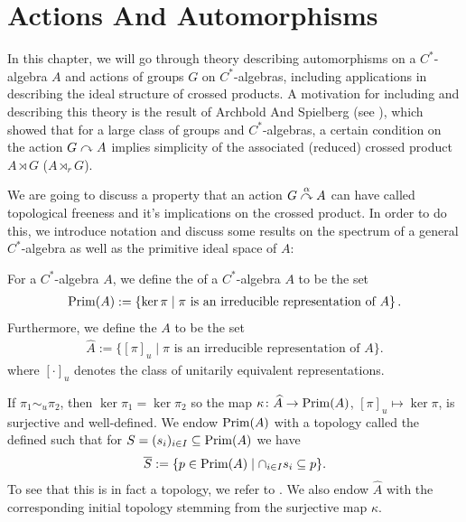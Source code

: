 \chapter{Actions And Automorphisms}
In this chapter, we will go through theory describing automorphisms on a $C^*$-algebra $A$ and actions of groups $G$ on $C^*$-algebras, including applications in describing the ideal structure of crossed products. A motivation for including and describing this theory is the result of Archbold And Spielberg (see \cite{archbold1994topologically}), which showed that for a large class of groups and $C^*$-algebras, a certain condition on the action $G \stackrel{}{\curvearrowright} A$ implies simplicity of the associated (reduced) crossed product $A \rtimes G$ ($A \rtimes_{r} G$).

We are going to discuss a property that an action $G \stackrel{\alpha}{\curvearrowright} A$ can have called topological freeness and it's implications on the crossed product. In order to do this, we introduce notation and discuss some results on the spectrum of a general $C^*$-algebra as well as the primitive ideal space of $A$:
\begin{definition}
	For a $C^*$-algebra $A$, we define the  of a $C^*$-algebra $A$ to be the set
	\begin{align*}
		\mathrm{Prim}(A) := \left\{ \ker \pi \mid \pi \text{ is an irreducible representation of } A \right\}.
	\end{align*}
	Furthermore, we define the  $A$ to be the set
	\begin{align*}
		\hat A := \{[\pi]_u \mid \pi \text{ is an irreducible representation of } A \}.
	\end{align*}
where $[\cdot]_u$ denotes the class of unitarily equivalent representations.

If $\pi_1 \sim_u \pi_2$, then $\ker \pi_1 = \ker \pi_2$ so the map $\kappa \colon \widehat{A} \to \mathrm{Prim}(A)$, $[\pi]_u \mapsto \ker \pi$, is surjective and well-defined. We endow $\mathrm{Prim}(A)$ with a topology called the  defined such that for $S = (s_i)_{i \in I} \subseteq \mathrm{Prim}(A)$ we have
\begin{align*}
	\overline S := \{ p \in \mathrm{Prim}(A) \mid \cap_{i \in I} s_i \subseteq p\}.
\end{align*}
To see that this is in fact a topology, we refer to \cite[Appendix A.2]{williamsmorita}. We also endow $\hat A$ with the corresponding initial topology stemming from the surjective map $\kappa$.
\end{definition}
